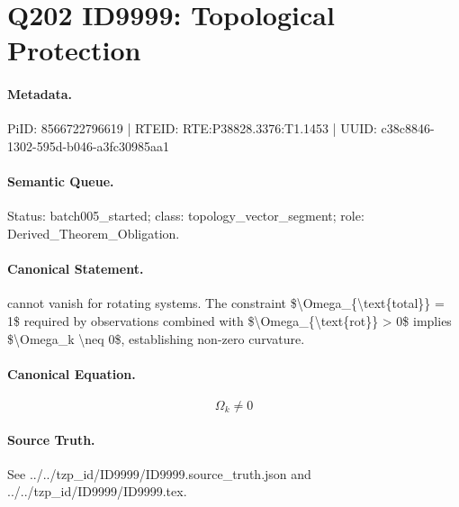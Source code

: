 \section*{Q202 ID9999: Topological Protection}
\paragraph{Metadata.}
PiID: 8566722796619 | RTEID: RTE:P38828.3376:T1.1453 | UUID: c38c8846-1302-595d-b046-a3fc30985aa1

\paragraph{Semantic Queue.}
Status: batch005\_started; class: topology\_vector\_segment; role: Derived\_Theorem\_Obligation.

\paragraph{Canonical Statement.}
cannot vanish for rotating systems. The constraint \$\textbackslash{}Omega\_\{\textbackslash{}text\{total\}\} = 1\$ required by observations combined with \$\textbackslash{}Omega\_\{\textbackslash{}text\{rot\}\} > 0\$ implies \$\textbackslash{}Omega\_k \textbackslash{}neq 0\$, establishing non-zero curvature.

\paragraph{Canonical Equation.}
\[
\Omega_k \neq 0
\]

\paragraph{Source Truth.}
See ../../tzp\_id/ID9999/ID9999.source\_truth.json and ../../tzp\_id/ID9999/ID9999.tex.
